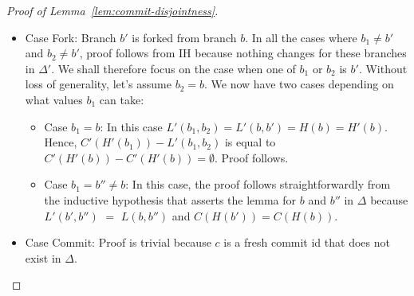 \begin{proof}[Proof of Lemma~\ref{lem:commit-disjointness}]
\begin{itemize}
\begin{itemize}
        \item $C'(H'(b)) = C(H(b'))$ in the conclusion of {\sc
          FastFwd} whereas it is equal to $C(H(b)) \cup C(H(b'))$ in
          {\sc Merge}. However since $C(H(b)) = C(L(b,b')) \subset
          C(H(b'))$ in the premise of {\sc FastFwd}, $C'(H'(b))$ in
          the conclusion is indeed equal to $C(H(b)) \cup C(H(b'))$
          like in {\sc Merge}.
      \end{itemize}
      Consequently, we can reuse the proof of {\sc Merge} as a proof
      of {\sc FastFwd}.

    \item Case {\sc Fork}: Branch $b'$ is forked from branch $b$. In
      all the cases where $b_1 \neq b'$ and $b_2 \neq b'$, proof
      follows from IH because nothing changes for these branches in
      $\Delta'$. We shall therefore focus on the case when one of
      $b_1$ or $b_2$ is $b'$. Without loss of generality, let's assume
      $b_2 = b$. We now have two cases depending on what values $b_1$
      can take:
      \begin{itemize}
        \item Case $b_1 = b$: In this case $L'(b_1,b_2) = L'(b,b') =
          H(b) = H'(b)$. Hence, $C'(H'(b_1)) - L'(b_1,b_2)$ is equal
          to $C'(H'(b)) - C'(H'(b)) = \emptyset$. Proof follows.

        \item Case $b_1 = b'' \neq b$: In this case, the proof follows
          straightforwardly from the inductive hypothesis that asserts
          the lemma for $b$ and $b''$ in $\Delta$ because $L'(b',b'')$
          $=$ $L(b,b'')$ and $C(H(b')) = C(H(b))$.
      \end{itemize}

    \item Case {\sc Commit}: Proof is trivial because $c$ is a fresh
      commit id that does not exist in $\Delta$.

  \end{itemize}
\end{proof}

